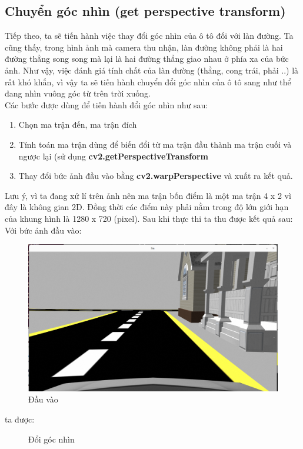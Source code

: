 \subsection{Chuyển góc nhìn (get perspective transform)}
Tiếp theo, ta sẽ tiến hành việc thay đổi góc nhìn của ô tô đối với làn đường. Ta cũng thấy, trong hình ảnh mà camera thu nhận, làn đường không phải là hai đường thẳng song song mà lại là hai đường thẳng giao nhau ở phía xa của bức ảnh. Như vậy, việc đánh giá tính chất của làn đường (thẳng, cong trái, phải ..) là rất khó khắn, vì vậy ta sẽ tiến hành chuyển đổi góc nhìn của ô tô sang như thể đang nhìn vuông góc từ trên trời xuống.\\
Các bước được dùng để tiến hành đổi góc nhìn như sau:
\begin{enumerate}
    \item Chọn ma trận đến, ma trận đích 
    \item Tính toán ma trận dùng để biến đổi từ ma trận đầu thành ma trận cuối và ngược lại (sử dụng \textbf{cv2.getPerspectiveTransform}
    \item Thay đổi bức ảnh đầu vào bằng \textbf{cv2.warpPerspective} và xuất ra kết quả.
\end{enumerate}
Lưu ý, vì ta đang xử lí trên ảnh nên ma trận bốn điểm là một ma trận 4 x 2 vì đây là không gian 2D. Đồng thời các điểm này phải nằm trong độ lớn giới hạn của khung hình là 1280 x 720 (pixel). Sau khi thực thi ta thu được kết quả sau:\\
%
Với bức ảnh đầu vào:\begin{figure}[htbp]
    \centering
    \includegraphics[width=0.4\linewidth]{images/3-lane/ori.png}
    \caption{Đầu vào}
\end{figure}
ta được:
\begin{figure}[htbp]
    \centering
    \caption{Đổi góc nhìn}
\end{figure}

